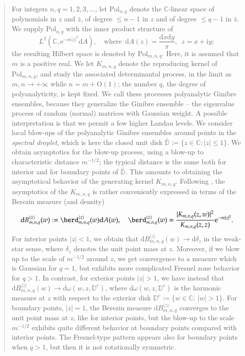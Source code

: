 \documentclass{birkart}
\theoremstyle{definition}
\theoremstyle{remark}
\numberwithin{equation}{section}
\numberwithin{figure}{section}
\newcommand{\e}{\mathrm e}
\newcommand{\1}{{\mathbf 1}}
\newcommand{\Rpar}{q}
\newcommand{\C}{{\mathbb C}}
\newcommand{\D}{{\mathbb D}}
\newcommand{\Ordo}{\mathrm{O}}
\newcommand{\diff}{{\mathrm d}}
\newcommand{\imag}{{\mathrm i}}
\begin{document}
\begin{abstract} 
For integers $n,\Rpar=1,2,3,\ldots$, let $\mathrm{Pol}_{n,\Rpar}$ denote the 
$\C$-linear space of polynomials in $z$ and $\bar z$, of degree $\le n-1$ in 
$z$ and of degree $\le\Rpar-1$ in $\bar z$. We supply $\mathrm{Pol}_{n,\Rpar}$ 
with the inner product structure of
\[ 
L^2\left(\C,\e^{-m|z|^2} \diff A\right),\quad\text{where}\,\,\, 
\diff A(z)=\frac{\diff x \diff y}{\pi},\,\,\,z= x+ \imag y;
\]
the resulting Hilbert space is denoted by $\mathrm{Pol}_{m,n,\Rpar}$. Here,
it is assumed that $m$ is a positive real. We let $K_{m,n,\Rpar}$ denote the 
reproducing kernel of $\mathrm{Pol}_{m,n,\Rpar}$, and study the associated
determinantal process, in the limit as $m, n\to+\infty$ while $n=m+\Ordo(1)$; 
the number $\Rpar$, the degree of polyanalyticity, is kept fixed.
We call these processes polyanalytic Ginibre ensembles, because they 
generalize the Ginibre ensemble -- the eigenvalue process of random (normal) 
matrices with Gaussian weight. A possible interpretation is that we permit a
few higher Landau levels. We consider local blow-ups of the polyanalytic
Ginibre ensembles around points in the {\em spectral droplet}, which is here
the closed unit disk $\bar\D:=\{z\in\C:|z|\le1\}$. We obtain asymptotics for
the blow-up process, using a blow-up to characteristic distance $m^{-1/2}$;
the typical distance is the same both for interior and for boundary points
of $\bar\D$.  
This amounts to obtaining the asymptotical behavior of the generating kernel
$K_{m,n,q}$. Following \cite{ahm1}, the asymptotics of the $K_{m,n,q}$ is
rather conveniently expressed in terms of the Berezin measure (and density)
\[ 
\diff B^{\langle z\rangle}_{m,n,\Rpar}(w):=
\berd_{m,n,\Rpar}^{\langle z\rangle}(w)\diff A(w),\quad
\berd_{m,n,\Rpar}^{\langle z\rangle}(w)= 
\frac{|K_{m,n,\Rpar}(z,w)|^2 }{K_{m,n,\Rpar}(z,z)}\e^{-m|z|^2}. 
\]
For interior points $|z|<1$, we obtain that  
$
\diff B^{\langle z\rangle}_{m,n,\Rpar}(w)\to \diff\delta_z 
$
in the weak-star sense, where $\delta_z$ denotes the unit point mass at $z$. 
Moreover, if we blow up to the scale of $m^{-1/2}$ 
around $z$, we get convergence to a measure which is Gaussian for $\Rpar=1$, 
but exhibits more complicated Fresnel zone behavior for $\Rpar>1$. 
In contrast, for exterior points $|z|>1$, we have instead that 
$ 
\diff B^{\langle z\rangle}_{m,n,\Rpar}(w) \to \diff \omega(w,z, \mathbb{D}^e) 
$,
where $\diff \omega(w,z,\mathbb{D}^e)$ is the harmonic measure at $z$  
with respect to the exterior disk $\mathbb{D}^e:= \{w\in\C:\, |w|>1\}$. 
For boundary points, $|z|=1$, the Berezin measure 
$\diff B^{\langle z\rangle}_{m,n,\Rpar}$ 
converges to the unit point mass at $z$, like for interior points, but the 
blow-up to the scale $m^{-1/2}$ exhibits quite different behavior at boundary
points compared with interior points. The Fresnel-type pattern appears also 
for boundary points when $\Rpar>1$, but then it is not rotationally symmetric. 
\end{abstract}
\end{document}
